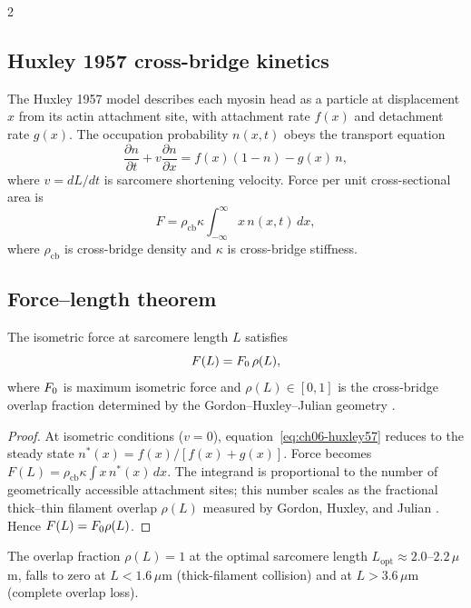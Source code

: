 \begin{multicols}{2}
\subsection{Huxley 1957 cross-bridge kinetics}

The Huxley 1957 model \citep{huxley1957} describes each myosin head as a
particle at displacement $x$ from its actin attachment site, with attachment
rate $f(x)$ and detachment rate $g(x)$.  The occupation probability $n(x,t)$
obeys the transport equation
\begin{equation}
  \frac{\partial n}{\partial t} + v\frac{\partial n}{\partial x}
  = f(x)(1-n) - g(x)\,n,
  \label{eq:ch06-huxley57}
\end{equation}
where $v = dL/dt$ is sarcomere shortening velocity.  Force per unit
cross-sectional area is
\begin{equation}
  F = \rho_{\mathrm{cb}}\kappa \int_{-\infty}^{\infty} x\,n(x,t)\,dx,
  \label{eq:ch06-force-int}
\end{equation}
where $\rho_{\mathrm{cb}}$ is cross-bridge density and $\kappa$ is
cross-bridge stiffness.

\subsection{Force--length theorem}

\begin{theorem}
\label{thm:ch06-forcelength}
The isometric force at sarcomere length $L$ satisfies
\begin{equation}
  F(L) = F_{0}\,\rho(L),
  \label{eq:ch06-fl}
\end{equation}
where $F_{0}$ is maximum isometric force and $\rho(L) \in [0,1]$ is the
cross-bridge overlap fraction determined by the Gordon--Huxley--Julian
geometry \citep{gordon1966}.
\end{theorem}

\begin{proof}
At isometric conditions ($v = 0$), equation~\eqref{eq:ch06-huxley57} reduces
to the steady state $n^*(x) = f(x)/[f(x)+g(x)]$.  Force becomes
$F(L) = \rho_{\mathrm{cb}}\kappa\int x\,n^*(x)\,dx$.  The integrand is
proportional to the number of geometrically accessible attachment sites; this
number scales as the fractional thick--thin filament overlap $\rho(L)$
measured by Gordon, Huxley, and Julian \citep{gordon1966}.  Hence
$F(L) = F_{0}\rho(L)$.
\end{proof}

The overlap fraction $\rho(L) = 1$ at the optimal sarcomere length
$L_{\mathrm{opt}} \approx 2.0$--$2.2\,\mu$m, falls to zero at
$L < 1.6\,\mu$m (thick-filament collision) and at $L > 3.6\,\mu$m
(complete overlap loss).


\end{multicols}

